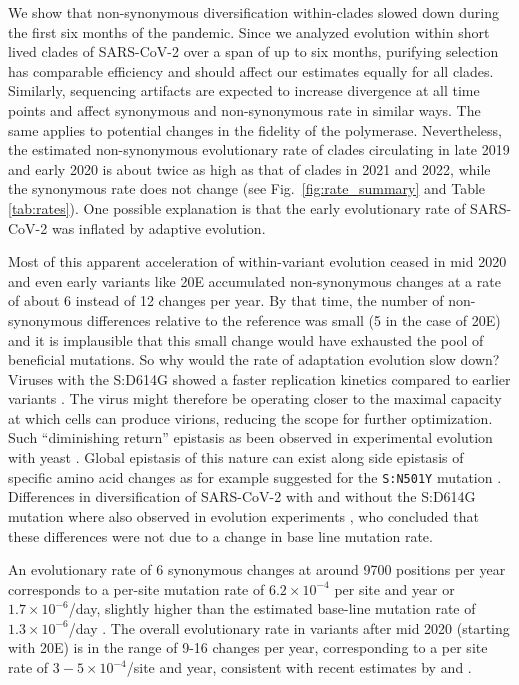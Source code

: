 \documentclass[aps,rmp, twocolumn]{revtex4}
\begin{document}
We show that non-synonymous diversification within-clades slowed down during the first six months of the pandemic.
Since we analyzed evolution within short lived clades of SARS-CoV-2 over a span of up to six months, purifying selection has comparable efficiency and should affect our estimates equally for all clades.
Similarly, sequencing artifacts are expected to increase divergence at all time points and affect synonymous and non-synonymous rate in similar ways.
The same applies to potential changes in the fidelity of the polymerase.
Nevertheless, the estimated non-synonymous evolutionary rate of clades circulating in late 2019 and early 2020 is about twice as high as that of clades in 2021 and 2022, while the synonymous rate does not change (see Fig.~\ref{fig:rate_summary} and Table \ref{tab:rates}).
One possible explanation is that the early evolutionary rate of SARS-CoV-2 was inflated by adaptive evolution.

Most of this apparent acceleration of within-variant evolution ceased in mid 2020 and even early variants like 20E accumulated non-synonymous changes at a rate of about 6 instead of 12 changes per year.
By that time, the number of non-synonymous differences relative to the reference was small (5 in the case of 20E) and it is implausible that this small change would have exhausted the pool of beneficial mutations.
So why would the rate of adaptation evolution slow down?
Viruses with the S:D614G showed a faster replication kinetics compared to earlier variants \citep{korber_tracking_2020}.
The virus might therefore be operating closer to the maximal capacity at which cells can produce virions, reducing the scope for further optimization.
Such ``diminishing return'' epistasis as been observed in experimental evolution with yeast \citep{kryazhimskiy_global_2014}.
Global epistasis of this nature can exist along side epistasis of specific amino acid changes as for example suggested for the \texttt{S:N501Y} mutation \citep{martin_emergence_2021}.
Differences in diversification of SARS-CoV-2 with and without the S:D614G mutation where also observed in evolution experiments \citep{amicone_mutation_2022}, who concluded that these differences were not due to a change in base line mutation rate.

An evolutionary rate of 6 synonymous changes at around 9700 positions per year corresponds to a per-site mutation rate of $6.2\times 10^{-4}$ per site and year or $1.7\times 10^{-6}$/day, slightly higher than the estimated base-line mutation rate of $1.3\times 10^{-6}$/day \citep{amicone_mutation_2022}.
The overall evolutionary rate in variants after mid 2020 (starting with 20E) is in the range of 9-16 changes per year, corresponding to a per site rate of $3 - 5\times 10^{-4}$/site and year, consistent with recent estimates by \citet{hill_origins_2022} and \citet{tay_emergence_2022}.
\end{document}
